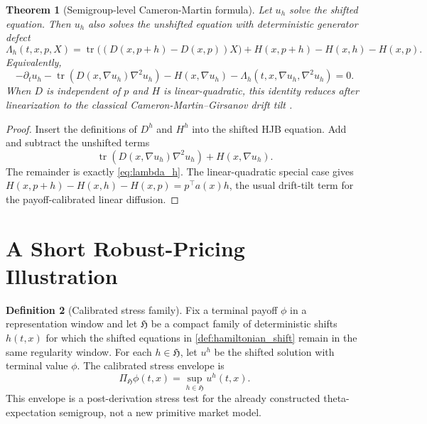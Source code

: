 \documentclass[11pt]{amsart}
\newtheorem{theorem}{Theorem}[section]
\theoremstyle{definition}
\newtheorem{definition}[theorem]{Definition}
\theoremstyle{remark}
\newcommand{\Tr}{\operatorname{tr}}
\begin{document}
\begin{theorem}[Semigroup-level Cameron-Martin formula]
\label{thm:nonlinear_cm_formula}
Let $u_h$ solve the shifted equation.  Then $u_h$ also solves the unshifted
equation with deterministic generator defect
\begin{equation}
\label{eq:lambda_h}
  \Lambda_h(t,x,p,X)
  =\Tr\bigl((D(x,p+h)-D(x,p))X\bigr)
  +H(x,p+h)-H(x,h)-H(x,p).
\end{equation}
Equivalently,
\begin{equation}
  -\partial_tu_h-\Tr(D(x,\nabla u_h)\nabla^2u_h)-H(x,\nabla u_h)
  -\Lambda_h(t,x,\nabla u_h,\nabla^2u_h)=0.
\end{equation}
When $D$ is independent of $p$ and $H$ is linear-quadratic, this identity
reduces after linearization to the classical Cameron-Martin--Girsanov drift
tilt \cite{protter2012stochastic}.
\end{theorem}

\begin{proof}
Insert the definitions of $D^h$ and $H^h$ into the shifted HJB equation.  Add
and subtract the unshifted terms
\[
  \Tr(D(x,\nabla u_h)\nabla^2u_h)+H(x,\nabla u_h).
\]
The remainder is exactly \eqref{eq:lambda_h}.  The linear-quadratic special
case gives
$H(x,p+h)-H(x,h)-H(x,p)=p^\top a(x)h$, the usual drift-tilt term for the
payoff-calibrated linear diffusion.
\end{proof}

\section{A Short Robust-Pricing Illustration}

\begin{definition}[Calibrated stress family]
\label{def:calibrated_stress_family}
Fix a terminal payoff \(\phi\) in a representation window and let
\(\mathfrak H\) be a compact family of deterministic shifts \(h(t,x)\) for
which the shifted equations in \cref{def:hamiltonian_shift} remain in the same
regularity window.  For each \(h\in\mathfrak H\), let \(u^h\) be the shifted
solution with terminal value \(\phi\).  The calibrated stress envelope is
\[
  \Pi_{\mathfrak H}\phi(t,x)
  =
  \sup_{h\in\mathfrak H} u^h(t,x).
\]
This envelope is a post-derivation stress test for the already constructed
theta-expectation semigroup, not a new primitive market model.
\end{definition}
\end{document}
